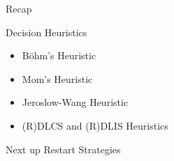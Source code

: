 \documentclass[t]{sdqbeamer}
\begin{document}

\begin{frame}{Recap}
\begin{block}{Decision Heuristics}
\begin{itemize}\setlength{\itemsep}{1ex}
	\item Böhm's Heuristic
	\item Mom's Heuristic
	\item Jeroslow-Wang Heuristic
	\item (R)DLCS and (R)DLIS Heuristics
\end{itemize}
\end{block}
\begin{block}{Next up}
	Restart Strategies
\end{block}
\end{frame}
		
\end{document}

